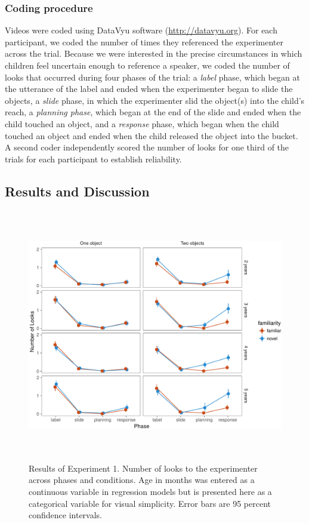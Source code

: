 \documentclass[10pt, letterpaper]{article}
\newenvironment{CodeChunk}{}{}
\begin{document}
\subsubsection{Coding procedure}\label{coding-procedure}

Videos were coded using DataVyu software (\url{http://datavyu.org}). For
each participant, we coded the number of times they referenced the
experimenter across the trial. Because we were interested in the precise
circumstances in which children feel uncertain enough to reference a
speaker, we coded the number of looks that occurred during four phases
of the trial: a \emph{label} phase, which began at the utterance of the
label and ended when the experimenter began to slide the objects, a
\emph{slide} phase, in which the experimenter slid the object(s) into
the child's reach, a \emph{planning phase}, which began at the end of
the slide and ended when the child touched an object, and a
\emph{response} phase, which began when the child touched an object and
ended when the child released the object into the bucket. A second coder
independently scored the number of looks for one third of the trials for
each participant to establish reliability.

\subsection{Results and Discussion}\label{results-and-discussion}

\begin{CodeChunk}
\begin{figure}[h]

{\centering \includegraphics[width=5.75in,height=4.35in]{figs/results_e1-1} 

}

\caption[Results of Experiment 1]{Results of Experiment 1. Number of looks to the experimenter across phases and conditions. Age in months was entered as a continuous variable in regression models but is presented here as a categorical variable for visual simplicity. Error bars are 95 percent confidence intervals.}\label{fig:results_e1}
\end{figure}
\end{CodeChunk}
\end{document}
